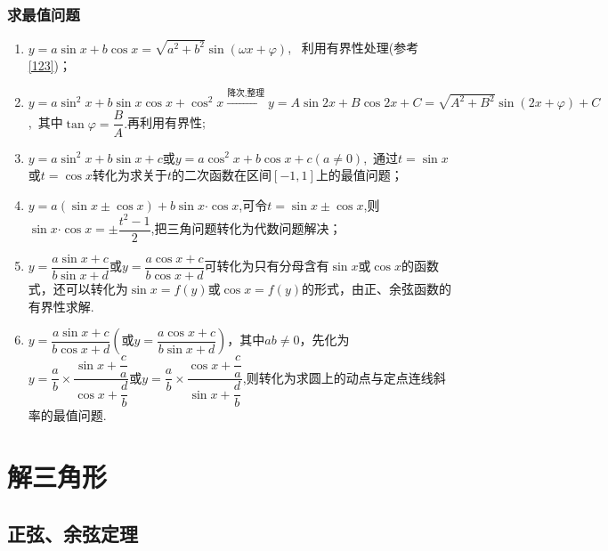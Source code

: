 \documentclass{BHCexam}
\begin{document}
{\subsubsection{求最值问题}\begin{enumerate}[(1)]
\item $ y=a\sin x+b\cos x=\sqrt{a^2+b^2}\sin\left(\omega x+\varphi\right) $,~ 利用有界性处理(参考\ref{123})；
\item $ y=a\sin^2x+b\sin x\cos x+\cos^2x \xrightarrow{\text{降次,整理}}y=A\sin 2x+B\cos2x+C=\sqrt{A^2+B^2}\sin(2x+\varphi)+C$,~其中$ \tan\varphi=\dfrac{B}{A} .$再利用有界性;
\item $ y=a\sin^2x+b\sin x+c \text{或}y=a\cos^2x+b\cos x+c(a\ne0)$,~通过$ t=\sin x $或$ t=\cos x $转化为求关于$ t $的二次函数在区间$ \left[-1,1\right]$上的最值问题；
\item $y=a\left(\sin x\pm\cos x\right)+b\sin x\bm{\cdot}\cos x $,可令$ t=\sin x\pm\cos x $,则$ \sin x\bm{\cdot}\cos x=\pm\dfrac{t^2-1}{2} $,把三角问题转化为代数问题解决；
\item $ y=\dfrac{a\sin x+c}{b\sin x+d} $或$ y=\dfrac{a\cos x+c}{b\cos x+d} $可转化为只有分母含有$ \sin x  $或$ \cos x $的函数式，还可以转化为$ \sin x=f(y) $或$ \cos x=f(y) $的形式，由正、余弦函数的有界性求解.
\item $y=\dfrac{a\sin x+c}{b\cos x+d}\left(\text{或}y=\dfrac{a\cos x+c}{b\sin x+d}\right)$，其中$ ab\ne0 $，先化为$ y=\dfrac{a}{b}\times\dfrac{\sin x+\dfrac{c}{a}}{\cos x+\dfrac{d}{b}} \text{或}y=\dfrac{a}{b}\times\dfrac{\cos x+\dfrac{c}{a}}{\sin x+\dfrac{d}{b}} $,则转化为求圆上的动点与定点连线斜率的最值问题.
\end{enumerate}
\section{解三角形}
\subsection{正弦、余弦定理}
}
\end{document}
